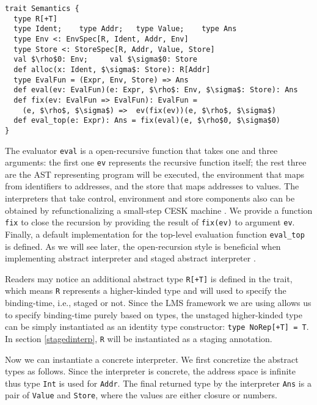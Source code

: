 
\begin{lstlisting}
trait Semantics {
  type R[+T]
  type Ident;    type Addr;   type Value;    type Ans
  type Env <: EnvSpec[R, Ident, Addr, Env]
  type Store <: StoreSpec[R, Addr, Value, Store]
  val $\rho$0: Env;     val $\sigma$0: Store
  def alloc(x: Ident, $\sigma$: Store): R[Addr]
  type EvalFun = (Expr, Env, Store) => Ans
  def eval(ev: EvalFun)(e: Expr, $\rho$: Env, $\sigma$: Store): Ans
  def fix(ev: EvalFun => EvalFun): EvalFun = 
    (e, $\rho$, $\sigma$) =>  ev(fix(ev))(e, $\rho$, $\sigma$)
  def eval_top(e: Expr): Ans = fix(eval)(e, $\rho$0, $\sigma$0)
}
\end{lstlisting}

The evaluator \texttt{eval} is a open-recursive function that takes one and three arguments: the first
one \texttt{ev} represents the recursive function itself; the rest three are the AST representing program 
will be executed, the environment that maps from identifiers to addresses, and the store that maps addresses to values.
The interpreters that take control, environment and store components also can be obtained by 
refunctionalizing \cite{DBLP:conf/ppdp/AgerBDM03, Wei:2018:RAA:3243631.3236800} a small-step CESK 
machine \cite{DBLP:conf/popl/FelleisenF87}.
We provide a function \texttt{fix} to close the recursion by providing the result of \texttt{fix(ev)} 
to argument \texttt{ev}. Finally, a default implementation for the top-level evaluation function \texttt{eval\_top} is defined.
As we will see later, the open-recursion style is beneficial when implementing abstract interpreter and 
staged abstract interpreter .

Readers may notice an additional abstract type \texttt{R[+T]} is defined in the trait,
which means \texttt{R} represents a higher-kinded type and will used to specify the binding-time, 
i.e., staged or not. Since the LMS framework we are using allows us to specify binding-time purely
based on types, the unstaged higher-kinded type can be simply instantiated as an identity type constructor: 
\texttt{type NoRep[+T] = T}. In section \ref{stagedinterp}, \texttt{R} will be instantiated 
as a staging annotation. 

Now we can instantiate a concrete interpreter. We first concretize the abstract types as follows.
Since the interpreter is concrete, the address space is infinite thus type \texttt{Int} is used for \texttt{Addr}.
The final returned type by the interpreter \texttt{Ans} is a pair of \texttt{Value} and \texttt{Store}, 
where the values are either closure or numbers.

